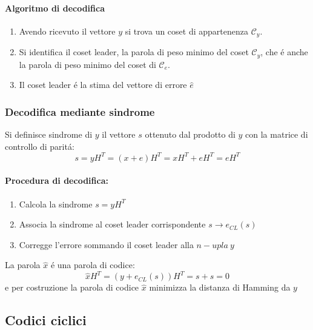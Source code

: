             \paragraph{Algoritmo di decodifica}
            \begin{enumerate}
                \item Avendo ricevuto il vettore $y$ si trova un coset di appartenenza $\mathcal{C}_y$.
                \item {Si identifica il coset leader, la parola di peso minimo del coset $\mathcal{C}_y$, che é anche la parola di peso minimo del 
                coset di $\mathcal{C}_e$.}
                \item Il coset leader é la stima del vettore di errore $\hat{e}$
            \end{enumerate}
        \subsubsection{Decodifica mediante sindrome}
            Si definisce sindrome di $y$ il vettore $s$ ottenuto dal prodotto di $y$ con la matrice di controllo di paritá:
            \[
                s = yH^T = (x+e)H^T = xH^T+eH^T = eH^T    
            \]
            \paragraph{Procedura di decodifica:}
                \begin{enumerate}
                    \item {Calcola la sindrome $s = yH^T$}
                    \item {Associa la sindrome al coset leader corrispondente $s\rightarrow e_{CL}(s)$}
                    \item {Corregge l'errore sommando il coset leader alla $n-upla\ y$}
                \end{enumerate}
                La parola $\hat{x}$ é una parola di codice:
                \[
                    \hat{x}H^T= (y+e_{CL}(s))H^T = s+s =0   
                \]
                e per costruzione la parola di codice $\hat{x}$ minimizza la distanza di Hamming da $y$
    \subsection{Codici ciclici}
